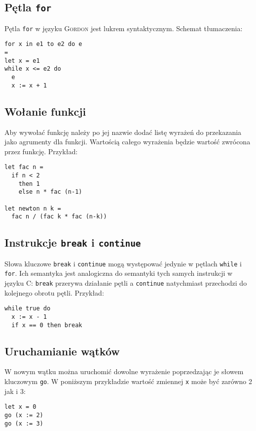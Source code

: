 \documentclass{documentation}
\begin{document}
\subsection{Pętla \texttt{for}}
Pętla \texttt{for} w języku \textsc{Gordon} jest lukrem syntaktycznym. Schemat tłumaczenia:

\begin{verbatim}
for x in e1 to e2 do e
=
let x = e1
while x <= e2 do
  e
  x := x + 1
\end{verbatim}

\subsection{Wołanie funkcji}
Aby wywołać funkcję należy po jej nazwie dodać listę wyrażeń do przekazania jako agrumenty dla funkcji.
Wartością całego wyrażenia będzie wartość zwrócona przez funkcję.
Przykład:

\begin{verbatim}
let fac n =
  if n < 2
    then 1
    else n * fac (n-1)

let newton n k =
  fac n / (fac k * fac (n-k))
\end{verbatim}

\subsection{Instrukcje \texttt{break} i \texttt{continue}}
Słowa kluczowe \texttt{break} i \texttt{continue} mogą występować jedynie w pętlach
\texttt{while} i \texttt{for}. Ich semantyka jest analogiczna do semantyki tych samych
instrukcji w języku \textsc{C}: \texttt{break} przerywa działanie pętli a \texttt{continue}
natychmiast przechodzi do kolejnego obrotu pętli. Przykład:

\begin{verbatim}
while true do
  x := x - 1
  if x == 0 then break
\end{verbatim}

\subsection{Uruchamianie wątków}
W nowym wątku można uruchomić dowolne wyrażenie poprzedzając je słowem kluczowym
\texttt{go}. W poniższym przykładzie wartość zmiennej \texttt{x} może być
zarówno 2 jak i 3:

\begin{verbatim}
let x = 0
go (x := 2)
go (x := 3)
\end{verbatim}
\end{document}
